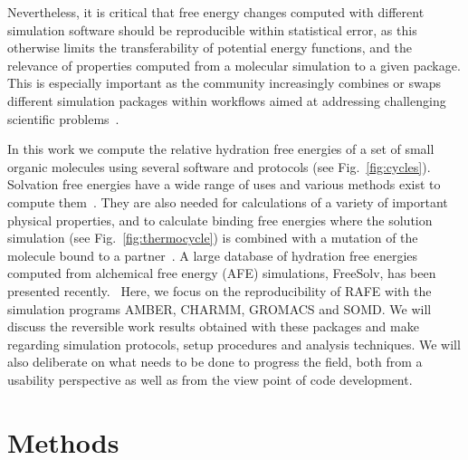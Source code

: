 \documentclass[journal=jctcce,manuscript=article]{achemso}
\providecommand{\DIFadd}[1]{\protect\cbstart{\protect\color{blue}\uwave{#1}}\protect\cbend} %
\providecommand{\DIFdel}[1]{\protect\cbdelete{\protect\color{red}\sout{#1}}\protect\cbdelete} %
\providecommand{\DIFaddbegin}{} %
\providecommand{\DIFaddend}{} %
\providecommand{\DIFdelbegin}{} %
\providecommand{\DIFdelend}{} %
\newcommand{\DIFscaledelfig}{0.5}
\newlength{\DIFdelgraphicswidth} %
\newlength{\DIFdelgraphicsheight} %
\newcommand{\DIFaddincludegraphics}[2][]{{\color{blue}\fbox{\DIFOincludegraphics[#1]{#2}}}} %
\newcommand{\DIFdelincludegraphics}[2][]{%
\sbox{\DIFdelgraphicsbox}{\DIFOincludegraphics[#1]{#2}}%
\settoboxwidth{\DIFdelgraphicswidth}{\DIFdelgraphicsbox} %
\settoboxtotalheight{\DIFdelgraphicsheight}{\DIFdelgraphicsbox} %
\scalebox{\DIFscaledelfig}{%
\parbox[b]{\DIFdelgraphicswidth}{\usebox{\DIFdelgraphicsbox}\\[-\baselineskip] \rule{\DIFdelgraphicswidth}{0em}}\llap{\resizebox{\DIFdelgraphicswidth}{\DIFdelgraphicsheight}{%
\setlength{\unitlength}{\DIFdelgraphicswidth}%
\begin{picture}(1,1)%
\thicklines\linethickness{2pt} %
{\color[rgb]{1,0,0}\put(0,0){\framebox(1,1){}}}%
{\color[rgb]{1,0,0}\put(0,0){\line( 1,1){1}}}%
{\color[rgb]{1,0,0}\put(0,1){\line(1,-1){1}}}%
\end{picture}%
}\hspace*{3pt}}} %
} %
\DeclareRobustCommand{\DIFaddbegin}{\DIFOaddbegin \let\includegraphics\DIFaddincludegraphics} %
\DeclareRobustCommand{\DIFaddend}{\DIFOaddend \let\includegraphics\DIFOincludegraphics} %
\DeclareRobustCommand{\DIFdelbegin}{\DIFOdelbegin \let\includegraphics\DIFdelincludegraphics} %
\DeclareRobustCommand{\DIFdelend}{\DIFOaddend \let\includegraphics\DIFOincludegraphics} %
\begin{document}
Nevertheless, it is critical that free energy
changes computed with different simulation software should be reproducible
within statistical error, as this otherwise limits the transferability of
potential energy functions, and the relevance of properties computed from a molecular simulation to a given package.  This is especially important as the community
increasingly combines or swaps different simulation packages within workflows
aimed at addressing challenging scientific
problems~\cite{Pronk:2011:CNP:2063384.2063465, doi:10.1021/ci8000937,
doi:10.1021/jp505332p, loeffler_fesetup:_2015,
DBLP:journals/corr/Balasubramanian16g}.

In this work we compute the relative hydration free energies of a
set of small organic molecules using several software and protocols (see Fig.~\ref{fig:cycles}).  Solvation free
energies have a wide range of uses and various methods exist to compute
them~\cite{Skyner:2015:PCCP}.  They are also needed for calculations of a
variety of important physical properties, and to calculate binding free
energies where the solution simulation  (see Fig.~\ref{fig:thermocycle}) is
combined with a mutation of the molecule bound to a
partner~\cite{Skyner:2015:PCCP}.  A large database of hydration free energies
computed from alchemical free energy (AFE) simulations, FreeSolv, has been
presented recently.~\cite{Mobley2014,doi:10.1021/acs.jced.7b00104} Here, we focus on the
reproducibility of RAFE with the simulation programs AMBER, CHARMM, GROMACS and
SOMD.  We will discuss the reversible work results obtained with these packages
and make \DIFdelbegin \DIFdel{recommendations }\DIFdelend \DIFaddbegin \DIFadd{observations }\DIFaddend regarding simulation protocols, setup procedures and
analysis techniques.  We will also deliberate on what needs to be done to
progress the field, both from a usability perspective as well as from the view
point of code development.


\section{Methods}
\label{sec:methods}
\end{document}
